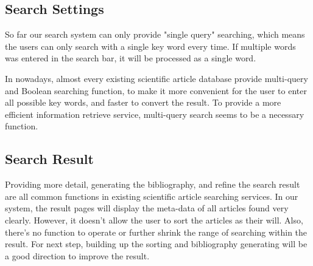 \subsection{Search Settings}

So far our search system can only provide "single query" searching, which means the users can only search with a  single key word every time.
If multiple words was entered in the search bar, it will be processed as a single word.

In nowadays, almost every existing scientific article database provide multi-query and Boolean searching function,
to make it more convenient for the user to enter all possible key words,
and faster to convert the result.
To provide a more efficient information retrieve service,
multi-query search seems to be a necessary function.

\subsection{Search Result}
Providing more detail, generating the bibliography, and refine the search result are all common functions in existing scientific article searching services.
In our system, the result pages will display the meta-data of all articles found very clearly.
However, it doesn't allow the user to sort the articles as their will. Also,
there's no function to operate or further shrink the range of searching within the result.
For next step,
building up the sorting and bibliography generating will be a good direction to improve the result.

